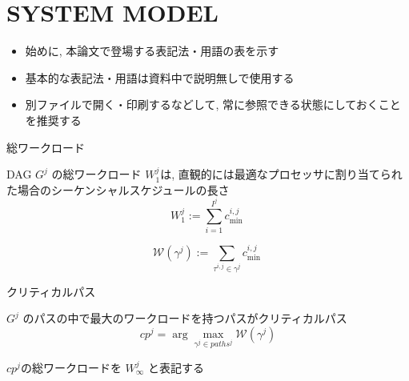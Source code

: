 
\section{SYSTEM MODEL}
\label{sec: SYSTEMMODEL}

\begin{frame}{}
    \begin{itemize}
        \item 始めに, 本論文で登場する表記法・用語の表を示す
        \item 基本的な表記法・用語は資料中で説明無しで使用する
        \item 別ファイルで開く・印刷するなどして, 常に参照できる状態にしておくことを推奨する
    \end{itemize}
\end{frame}



\begin{frame}{総ワークロード}
    \begin{definition}
        DAG $G^j$ の総ワークロード $W_1^j$は, 直観的には最適なプロセッサに割り当てられた場合のシーケンシャルスケジュールの長さ
        \begin{equation*}
            W_1^j:=\sum_{i=1}^{I^j} c_{\text {min }}^{i, j}
        \end{equation*}
    \end{definition}
    \begin{definition}
        \begin{equation*}
            \mathcal{W}\left(\gamma^j\right):=\sum_{\tau^{i, j} \in \gamma^j} c_{\text {min }}^{i, j}
        \end{equation*}
    \end{definition}
\end{frame}

\begin{frame}{クリティカルパス}
    \begin{definition}[$G^j$のクリティカルパス $cp^j$]
        $G^j$ のパスの中で最大のワークロードを持つパスがクリティカルパス
        \begin{equation*}
            c p^j=\arg \max _{\gamma^j \in p a t h s^j} \mathcal{W}\left(\gamma^j\right)
        \end{equation*}
    \end{definition}
    \vspace{5mm}
    $cp^j$の総ワークロードを $W_\infty^j$ と表記する
\end{frame}

